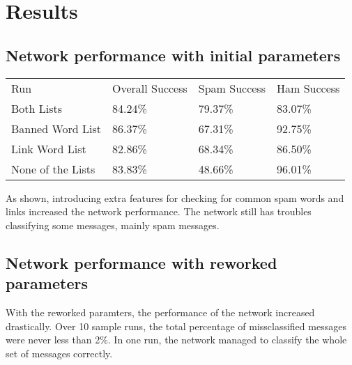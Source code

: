 
\section{Results}
  \subsection{Network performance with initial parameters}
  \label{sec:initialresults}
    \begin{table}[h]
    \begin{tabular}{llll}
    Run               & Overall Success & Spam Success & Ham Success \\
    Both Lists        & 84.24\%         & 79.37\%      & 83.07\%     \\
    Banned Word List  & 86.37\%         & 67.31\%      & 92.75\%     \\
    Link Word List    & 82.86\%         & 68.34\%      & 86.50\%     \\
    None of the Lists & 83.83\%         & 48.66\%      & 96.01\%    
    \end{tabular}
    \end{table}
    As shown, introducing extra features for checking for common spam words and
    links increased the network performance. The network still has troubles
    classifying some messages, mainly spam messages.
  \subsection{Network performance with reworked parameters}
  \label{sec:reworkedresults}
    With the reworked paramters, the performance of the network increased
    drastically. Over 10 sample runs, the total percentage of missclassified
    messages were never less than 2\%. In one run, the network managed to
    classify the whole set of messages correctly.
